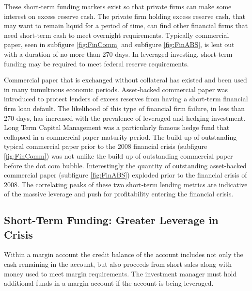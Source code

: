 These short-term funding markets exist so that private firms can make some interest on excess reserve cash.  The private firm holding excess reserve cash, that may want to remain liquid for a period of time, can find other financial firms that need short-term cash to meet overnight requirements.  Typically commercial paper, seen in subfigure \ref{fig:FinComm} and subfigure \ref{fig:FinABS}, is lent out with a duration of no more than 270 days.  In leveraged investing, short-term funding may be required to meet federal reserve requirements.  

Commercial paper that is exchanged without collateral has existed and been used in many tumultuous economic periods.  Asset-backed commercial paper was introduced to protect lenders of excess reserves from having a short-term financial firm loan default.  The likelihood of this type of financial firm failure, in less than 270 days, has increased with the prevalence of leveraged and hedging investment.  Long Term Capital Management was a particularly famous hedge fund that collapsed in a commercial paper maturity period.  The build up of outstanding typical commercial paper prior to the 2008 financial crisis (subfigure \ref{fig:FinComm}) was not unlike the build up of outstanding commercial paper before the dot com bubble.  Interestingly the quantity of outstanding asset-backed commercial paper (subfigure \ref{fig:FinABS}) exploded prior to the financial crisis of 2008.  The correlating peaks of these two short-term lending metrics are indicative of the massive leverage and push for profitability entering the financial crisis. 



\subsection{Short-Term Funding: Greater Leverage in Crisis}

Within a margin account the credit balance of the account includes not only the cash remaining in the account, but also proceeds from short sales along with money used to meet margin requirements.  The investment manager must hold additional funds in a margin account if the account is being leveraged.

